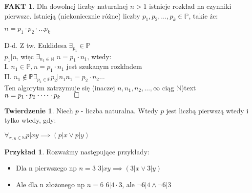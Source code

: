 \documentclass{article}
\theoremstyle{definition}
\theoremstyle{definition}
\newtheorem{tw}{Twierdzenie}[subsection]
\theoremstyle{definition}
\newtheorem{pk}{Przykład}[subsection]
\theoremstyle{definition}
\newtheorem*{fakt}{FAKT}
\begin{document}
\begin{fakt}
    Dla dowolnej liczby naturalnej $n>1$ istnieje rozkład na czynniki pierwsze. 
    Istnieją (niekoniecznie różne) liczby $p_1,p_2,\dots,p_k \in \mathbb{P}$, takie że:
    \begin{center}
        $n=p_1\cdot p_2\cdot \dots p_k$
    \end{center}
    D-d. Z tw. Euklidesa $\exists_{p_1} \in \mathbb{P}$\\
    $p_1|n$, więc $\exists_{n_1\in\mathbb{N}}$ $n=p_1\cdot n_1$, wtedy:\\
    I. $n_1\in\mathbb{P}, n=p_1\cdot n_1$ jest szukanym rozkładem\\
    II. $n_1\notin\mathbb{P} \exists_{p_2\in\mathbb{P}} p_2|n_1 n_1=p_2\cdot n_2 \dots$\\
    Ten algorytm zatrzymuje się (inaczej $n, n_1, n_2, \dots, \infty$ ciąg $\mathbb{N}$)text\\
    $n=p_1\cdot p_2\cdot \dots \cdot p_k \qed$
\end{fakt}

\begin{tw}
    Niech $p$ - liczba naturalna. Wtedy $p$ jest liczbą pierwszą wtedy i tylko wtedy, gdy:
    \begin{center}
        $\forall_{x,y\in\mathbb{N}} p|xy \implies (p|x \lor p|y)$
    \end{center}
\end{tw}

\begin{pk}
    Rozważmy następujące przykłady:
    \begin{itemize}
    \item Dla n pierwszego np $n=3$
    $3|xy \implies (3|x \lor 3|y)$
    \item Ale dla n złożonego np $n=6$
    $6|4\cdot 3$, ale $\neg 6|4 \land \neg 6|3$
    \end{itemize}
\end{pk}
\end{document}
